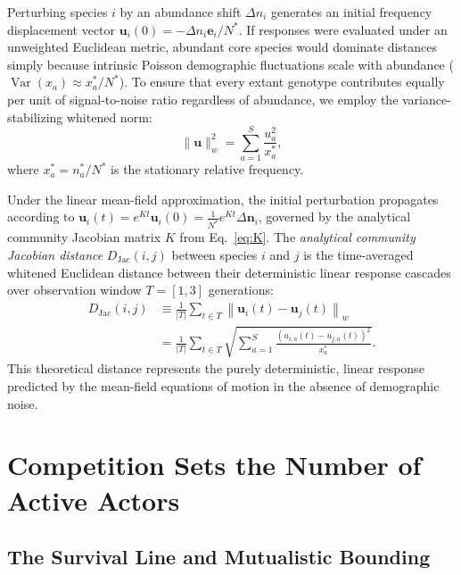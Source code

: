 \documentclass[twocolumn,amsmath,amssymb,aps,pra,10pt,floatfix,nofootinbib]{revtex4-2}
\begin{document}
Perturbing species $i$ by an abundance shift $\Delta n_i$ generates an initial frequency displacement vector $\mathbf{u}_i(0) = -\Delta n_i \mathbf{e}_i / N^*$. If responses were evaluated under an unweighted Euclidean metric, abundant core species would dominate distances simply because intrinsic Poisson demographic fluctuations scale with abundance ($\operatorname{Var}(x_a) \approx x_a^* / N^*$). To ensure that every extant genotype contributes equally per unit of signal-to-noise ratio regardless of abundance, we employ the variance-stabilizing whitened norm:
\begin{equation}
\|\mathbf{u}\|_w^2 = \sum_{a=1}^S \frac{u_a^2}{x_a^*},
\label{eq:whitened_norm}
\end{equation}
where $x_a^* = n_a^* / N^*$ is the stationary relative frequency.

Under the linear mean-field approximation, the initial perturbation propagates according to $\mathbf{u}_i(t) = e^{Kt} \mathbf{u}_i(0) = \frac{1}{N^*} e^{Kt} \Delta\mathbf{n}_i$, governed by the analytical community Jacobian matrix $K$ from Eq.~\eqref{eq:K}. The \textit{analytical community Jacobian distance} $D_{\text{Jac}}(i,j)$ between species $i$ and $j$ is the time-averaged whitened Euclidean distance between their deterministic linear response cascades over observation window $T = [1, 3]$ generations:
\begin{equation}
\begin{split}
D_{\text{Jac}}(i,j) &\equiv \frac{1}{|T|} \sum_{t \in T} \left\| \mathbf{u}_i(t) - \mathbf{u}_j(t) \right\|_w \\
&= \frac{1}{|T|} \sum_{t \in T} \sqrt{ \sum_{a=1}^S \frac{\left( u_{i,a}(t) - u_{j,a}(t) \right)^2}{x_a^*} }.
\end{split}
\label{eq:D_jac}
\end{equation}
This theoretical distance represents the purely deterministic, linear response predicted by the mean-field equations of motion in the absence of demographic noise.

\section{Competition Sets the Number of Active Actors}
\label{sec:core}

\subsection{The Survival Line and Mutualistic Bounding}
\end{document}
